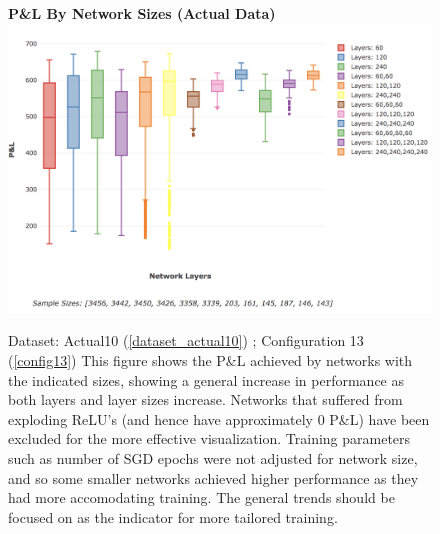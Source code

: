 \documentclass[a4paper,11pt,oneside]{article}
\theoremstyle{plain}
\theoremstyle{definition}
\begin{document}
\begin{figure}[H]
	\centering 
	\textbf{P\&L By Network Sizes (Actual Data)}
	\includegraphics[scale=0.3]{images/results/network/actual_pl_box.png} 
	\caption[P\&L By Network Sizes (Actual Data)]{Dataset: Actual10 (\ref{dataset_actual10}) ; Configuration 13 (\ref{config13})
		\newline This figure shows the P\&L achieved by networks with the indicated sizes, showing a general increase in performance as both layers and layer sizes increase. Networks that suffered from exploding ReLU's (and hence have approximately 0 P\&L) have been excluded for the more effective visualization. Training parameters such as number of SGD epochs were not adjusted for network size, and so some smaller networks achieved higher performance as they had more accomodating training. The general trends should be focused on as the indicator for more tailored training.}
	\label{figure-results_actual_pl_box}
\end{figure}
\end{document}
